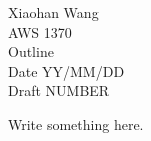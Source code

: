 \documentclass[12pt]{article}
\begin{document}
\begin{flushright}
Xiaohan Wang\\
AWS 1370\\
Outline\\
Date YY/MM/DD\\
Draft NUMBER
\end{flushright}
\setlength{\parindent}{0pt}
Write something here.
\end{document}

